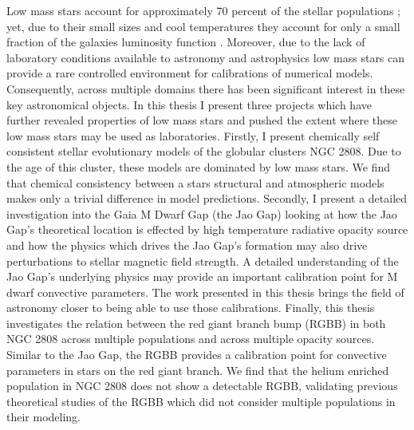 Low mass stars account for approximately 70 percent of the stellar populations
\citep{Conroy2012}; yet, due to their small sizes and cool temperatures they
account for only a small fraction of the galaxies luminosity function
\citep{Laughlin1997}. Moreover, due to the lack of laboratory conditions
available to astronomy and astrophysics low mass stars can provide a rare
controlled environment for calibrations of numerical models. Consequently,
across multiple domains there has been significant interest in these key
astronomical objects. In this thesis I present three projects which have
further revealed properties of low mass stars and pushed the extent where
these low mass stars may be used as laboratories. Firstly, I present chemically
self consistent stellar evolutionary models of the globular clusters NGC 2808.
Due to the age of this cluster, these models are dominated by low mass stars.
We find that chemical consistency between a stars structural and atmospheric
models makes only a trivial difference in model predictions. Secondly, I
present a detailed investigation into the Gaia M Dwarf Gap (the Jao Gap)
looking at how the Jao Gap's theoretical location is effected by high
temperature radiative opacity source and how the physics which drives the Jao
Gap's formation may also drive perturbations to stellar magnetic field
strength. A detailed understanding of the Jao Gap's underlying physics may
provide an important calibration point for M dwarf convective parameters. The
work presented in this thesis brings the field of astronomy closer to being
able to use those calibrations. Finally, this thesis investigates the relation
between the red giant branch bump (RGBB) in both NGC 2808 across multiple
populations and across multiple opacity sources. Similar to the Jao Gap, the
RGBB provides a calibration point for convective parameters in stars on the red
giant branch. We find that the helium enriched population in NGC 2808 does not
show a detectable RGBB, validating previous theoretical studies of the RGBB
which did not consider multiple populations in their modeling. 
